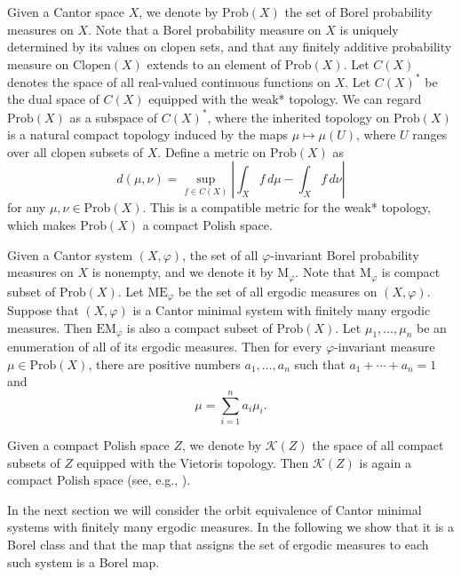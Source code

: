 \documentclass{amsart}
\newtheorem{theorem}{Theorem}[section]
\theoremstyle{definition}
\theoremstyle{problem}
\theoremstyle{remark}
\numberwithin{equation}{section}
\newcommand{\calK}{\mathcal{K}}
\begin{document}
Given a Cantor space $X$, we denote by $\mbox{Prob}(X)$ the set of Borel probability measures on  $X$.   Note  that a Borel probability measure on $X$ is uniquely determined by its values on clopen sets, and that any finitely additive probability measure on $\mbox{Clopen}(X)$ extends to an element of  $\mbox{Prob}(X)$. Let $C(X)$ denotes the space of all real-valued continuous functions on $X$. Let $C(X)^*$ be the dual space of $C(X)$ equipped  with the weak*  topology. We can regard  $\mbox{Prob}(X)$ as a subspace of $C(X)^*$, where the inherited topology on $\mbox{Prob}(X)$ is a natural compact topology induced by the maps $\mu \mapsto \mu(U)$,  where $U$ ranges over all clopen subsets of $X$.  Define a metric on $\mbox{Prob}(X)$ as 
$$d(\mu, \nu)=\sup_{f\in C(X)}\left| \int_X  f\,d\mu- \int_X  f\, d\nu\right|$$ for any $\mu, \nu \in \mbox{Prob}(X)$.  This is a  compatible metric for the weak* topology, which makes $\mbox{Prob}(X)$ a compact Polish space.





Given a Cantor system $(X,\varphi)$, the set of all $\varphi$-invariant Borel probability measures on $X$ is nonempty, and we denote it by $\mbox{M}_\varphi$. Note that $\mbox{M}_\varphi$ is compact subset of $\mbox{Prob}(X)$. Let $\mbox{ME}_\varphi$ be the set of all ergodic measures on $(X,\varphi)$. Suppose that $(X,\varphi)$ is  a Cantor minimal system with finitely many ergodic measures. Then $\mbox{EM}_\varphi$ is also a compact subset of $\mbox{Prob}(X)$.  Let $\mu_1,\dots, \mu_n$ be  an enumeration of all of its ergodic measures. Then 
for every $\varphi$-invariant measure $\mu\in \mbox{Prob}(X)$,  there are positive  numbers $a_1,\dots, a_n$ such that $a_1+\cdots +a_n=1$ and 
$$\mu=\sum_{i=1}^na_i\mu_i.$$

Given a compact Polish space $Z$, we denote by $\calK(Z)$ the space  of  all compact   subsets of $Z$ equipped with the Vietoris topology.  Then $\calK(Z)$ is again a compact Polish space (see, e.g., \cite[Theorem 4.26]{KechrisBook}).

In the next section we will consider the orbit equivalence of Cantor minimal systems with finitely many ergodic measures. In the following we show that it is a Borel class and that the map that assigns the set of ergodic measures to each such system is a Borel map. 

\end{document}
